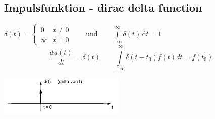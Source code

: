 \subsection{Impulsfunktion - dirac delta function}
	\begin{minipage}{10cm}
		$\delta (t)=\begin{cases} 0 & t\ne 0\\\infty & t=0\end{cases} \qquad
		\text{und} \qquad \int\limits_{-\infty}^\infty \delta(t) \, \mathrm dt = 1 $\\
		$$\frac{du(t)}{dt}=\delta(t) \qquad
		\int\limits_{-\infty}^{\infty}\delta(t-t_0)f(t)dt=f(t_0)$$
	\end{minipage}
	\begin{minipage}{8cm}
		\includegraphics[width=6cm]{./bilder/diracimpulse.png}
	\end{minipage}